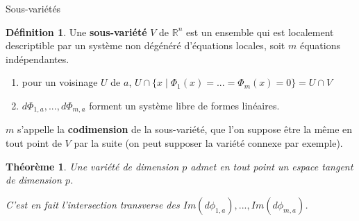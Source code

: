 \documentclass[compress]{beamer}
\newcommand{\R}{\mathbb{R}}
\newtheorem{thm}{Théorème}
\theoremstyle{definition}
\newtheorem{defn}{Définition}
\begin{document}
\begin{frame}{Sous-variétés}
    \begin{defn}
        Une \textbf{sous-variété} $V$ de $\R^n$ est un ensemble qui est localement descriptible par un \alert{système non dégénéré d'équations locales}, soit $m$ équations indépendantes.
        \begin{enumerate}[<+->]
            \item pour un voisinage $U$ de $a$, $U\cap\{x\mid\Phi_1(x)=...=\Phi_m(x)=0\}=U\cap V$
            \item $d\Phi_{1,a},...,d\Phi_{m,a}$ forment un système libre de formes linéaires.
        \end{enumerate}
        \pause[3]
        $m$ s'appelle la \textbf{codimension} de la sous-variété, que l'on suppose être la même en tout point de $V$ par la suite (on peut supposer la variété connexe par exemple).
    \end{defn}

    \pause
    \begin{thm}
        Une variété de dimension $p$ admet en tout point un \alert{espace tangent} de dimension $p$.

        C'est en fait l'intersection \alert{transverse} des $Im(d\phi_{1,a}),...,Im(d\phi_{m,a})$.
    \end{thm}
\end{frame}
\end{document}
